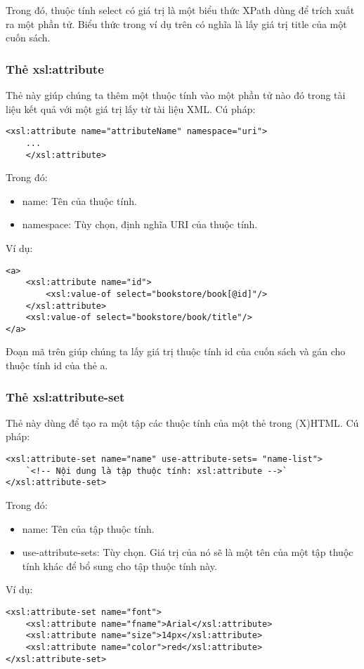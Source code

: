 Trong đó, thuộc tính select có giá trị là một biểu thức XPath dùng để trích xuất ra một phần tử. Biểu thức trong ví dụ trên có nghĩa là lấy giá trị title của một cuốn sách.
\subsubsection {Thẻ xsl:attribute}
Thẻ này giúp chúng ta thêm một thuộc tính vào một phần tử nào đó trong tài liệu kết quả với một giá trị lấy từ tài liệu XML. Cú pháp:
\lstset{language=XML}
\begin{lstlisting}[escapechar=`]
	<xsl:attribute name="attributeName" namespace="uri">
	...
	</xsl:attribute>
\end{lstlisting}
Trong đó: 
\begin{itemize}

\item {\ttfamily  name}: Tên của thuộc tính.
\item {\ttfamily  namespace}: Tùy chọn, định nghĩa URI của thuộc tính.
\end{itemize}
Ví dụ:
\lstset{language=XML}
\begin{lstlisting}[escapechar=`]
<a>
	<xsl:attribute name="id">
		<xsl:value-of select="bookstore/book[@id]"/>
	</xsl:attribute>
	<xsl:value-of select="bookstore/book/title"/>
</a>
\end{lstlisting}

Đoạn mã trên giúp chúng ta lấy giá trị thuộc tính {\ttfamily id} của cuốn sách và gán cho thuộc tính {\ttfamily id} của thẻ {\ttfamily a}.
\subsubsection {Thẻ xsl:attribute-set}
Thẻ này dùng để tạo ra một tập các thuộc tính của một thẻ trong (X)HTML. Cú pháp:
\lstset{language=XML}
\begin{lstlisting}[escapechar=`]
<xsl:attribute-set name="name" use-attribute-sets= "name-list">
	`<!-- Nội dung là tập thuộc tính: xsl:attribute -->`
</xsl:attribute-set>
\end{lstlisting}
Trong đó:
\begin{itemize}

\item {\ttfamily  name}: Tên của tập thuộc tính.

\item {\ttfamily  use-attribute-sets}: Tùy chọn. Giá trị của nó sẽ là một tên của một tập thuộc tính khác để bổ sung cho tập thuộc tính này.
\end{itemize}
Ví dụ:
\lstset{language=XML}
\begin{lstlisting}[escapechar=`]
<xsl:attribute-set name="font">
	<xsl:attribute name="fname">Arial</xsl:attribute>
	<xsl:attribute name="size">14px</xsl:attribute>
	<xsl:attribute name="color">red</xsl:attribute>
</xsl:attribute-set>
\end{lstlisting}


